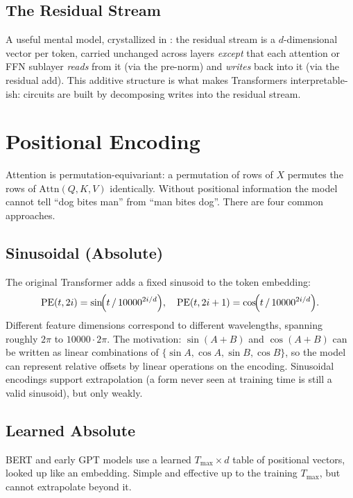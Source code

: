 \subsection{The Residual Stream}

A useful mental model, crystallized in
\citet{elhage2021mathematical}: the residual stream is a
$d$-dimensional vector per token, carried unchanged across layers
\emph{except} that each attention or FFN sublayer \emph{reads} from it
(via the pre-norm) and \emph{writes} back into it (via the residual
add). This additive structure is what makes Transformers
interpretable-ish: circuits are built by decomposing writes into the
residual stream.

\section{Positional Encoding}

Attention is permutation-equivariant: a permutation of rows of $X$
permutes the rows of $\mathrm{Attn}(Q, K, V)$ identically. Without
positional information the model cannot tell ``dog bites man'' from
``man bites dog''. There are four common approaches.

\subsection{Sinusoidal (Absolute)}

The original Transformer \citep{vaswani2017attention} adds a fixed
sinusoid to the token embedding:
\begin{equation}
\label{eq:ch5-sinusoidal}
\mathrm{PE}(t, 2i)     = \sin\!\Bigl(t \,/\, 10000^{2i/d}\Bigr),
\quad
\mathrm{PE}(t, 2i+1)   = \cos\!\Bigl(t \,/\, 10000^{2i/d}\Bigr).
\end{equation}
Different feature dimensions correspond to different wavelengths,
spanning roughly $2\pi$ to $10000 \cdot 2\pi$. The motivation:
$\sin(A+B)$ and $\cos(A+B)$ can be written as linear combinations of
$\{\sin A, \cos A, \sin B, \cos B\}$, so the model can represent
relative offsets by linear operations on the encoding. Sinusoidal
encodings support extrapolation (a form never seen at training time
is still a valid sinusoid), but only weakly.

\subsection{Learned Absolute}

BERT \citep{devlin2019bert} and early GPT models use a learned
$T_{\max} \times d$ table of positional vectors, looked up like an
embedding. Simple and effective up to the training $T_{\max}$, but
cannot extrapolate beyond it.

